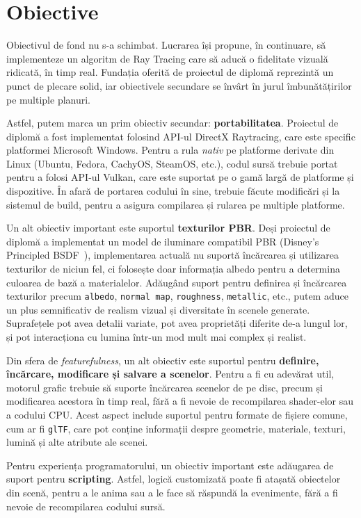 \documentclass[12pt,a4paper]{report}
\numberwithin{equation}{section} %
\begin{document}
\section{Obiective}

Obiectivul de fond nu s-a schimbat.
Lucrarea își propune, în continuare, să implementeze un algoritm de Ray Tracing care să aducă o fidelitate vizuală ridicată, în timp real.
Fundația oferită de proiectul de diplomă reprezintă un punct de plecare solid, iar obiectivele secundare se învârt în jurul îmbunătățirilor pe multiple planuri.

Astfel, putem marca un prim obiectiv secundar: \textbf{portabilitatea}.
Proiectul de diplomă a fost implementat folosind API-ul DirectX Raytracing, care este specific platformei Microsoft Windows.
Pentru a rula \textit{nativ} pe platforme derivate din Linux (Ubuntu, Fedora, CachyOS, SteamOS, etc.), codul sursă trebuie portat pentru a folosi API-ul Vulkan, care este suportat pe o gamă largă de platforme și dispozitive.
În afară de portarea codului în sine, trebuie făcute modificări și la sistemul de build, pentru a asigura compilarea și rularea pe multiple platforme.

Un alt obiectiv important este suportul \textbf{texturilor PBR}.
Deși proiectul de diplomă a implementat un model de iluminare compatibil PBR (Disney's Principled BSDF~\cite{DisneyBSDF}), implementarea actuală nu suportă încărcarea și utilizarea texturilor de niciun fel, ci folosește doar informația albedo pentru a determina culoarea de bază a materialelor.
Adăugând suport pentru definirea și încărcarea texturilor precum \texttt{albedo}, \texttt{normal map}, \texttt{roughness}, \texttt{metallic}, etc., putem aduce un plus semnificativ de realism vizual și diversitate în scenele generate.
Suprafețele pot avea detalii variate, pot avea proprietăți diferite de-a lungul lor, și pot interacționa cu lumina într-un mod mult mai complex și realist.

Din sfera de \textit{featurefulness}, un alt obiectiv este suportul pentru \textbf{definire, încărcare, modificare și salvare a scenelor}.
Pentru a fi cu adevărat util, motorul grafic trebuie să suporte încărcarea scenelor de pe disc, precum și modificarea acestora în timp real, fără a fi nevoie de recompilarea shader-elor sau a codului CPU.
Acest aspect include suportul pentru formate de fișiere comune, cum ar fi \texttt{glTF}, care pot conține informații despre geometrie, materiale, texturi, lumină și alte atribute ale scenei.

Pentru experiența programatorului, un obiectiv important este adăugarea de suport pentru \textbf{scripting}.
Astfel, logică customizată poate fi atașată obiectelor din scenă, pentru a le anima sau a le face să răspundă la evenimente, fără a fi nevoie de recompilarea codului sursă.
\end{document}
